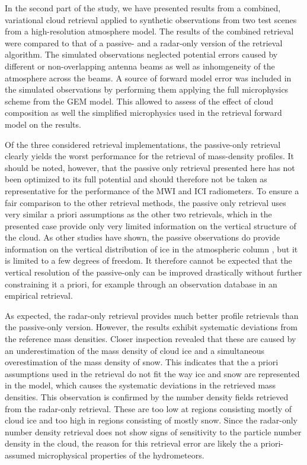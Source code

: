 \documentclass[journal abbreviation, manuscript]{copernicus}
\begin{document}
In the second part of the study, we have presented results from a combined,
variational cloud retrieval applied to synthetic observations from two test
scenes from a high-resolution atmosphere model. The results of the combined
retrieval were compared to that of a passive- and a radar-only version of the
retrieval algorithm. The simulated observations neglected potential errors
caused by different or non-overlapping antenna beams as well as inhomgeneity of
the atmosphere across the beams. A source of forward model error was included in
the simulated observations by performing them applying the full microphysics
scheme from the GEM model. This allowed to assess of the effect of cloud composition
as well the simplified microphysics used in the retrieval forward model on the
results.

Of the three considered retrieval implementations, the passive-only retrieval
clearly yields the worst performance for the retrieval of mass-density profiles.
It should be noted, however, that the passive only retrieval presented here has
not been optimized to its full potential and should therefore not be taken as
representative for the performance of the MWI and ICI radiometers. To ensure a
fair comparison to the other retrieval methods, the passive only retrieval uses
very similar a priori assumptions as the other two retrievals, which in the
presented case provide only very limited information on the vertical structure
of the cloud. As other studies have shown, the passive observations do  provide
information on the vertical distribution of ice in the atmospheric column
\citep{wang16, grutzun18}, but it is limited to a few degrees of freedom. It
therefore cannot be expected that the vertical resolution of the passive-only
can be improved drastically without further constraining it a priori, for
example through an observation database in an empirical retrieval.

As expected, the radar-only retrieval provides much better profile retrievals
than the passive-only version. However, the results exhibit systematic
deviations from the reference mass densities. Closer inspection revealed that
these are caused by an underestimation of the mass density of cloud ice and a
simultaneous overestimation of the mass density of snow. This indicates that the
a priori assumptions used in the retrieval do not fit the way ice and snow are
represented in the model, which causes the systematic deviations in the
retrieved mass densities. This observation is confirmed by the number density
fields retrieved from the radar-only retrieval. These are too low at regions
consisting mostly of cloud ice and too high in regions consisting of mostly snow.
Since the radar-only number density retrieval does not show signs of sensitivity
to the particle number density in the cloud, the reason for this retrieval error
are likely the a priori-assumed microphysical properties of the hydrometeors.
\end{document}

